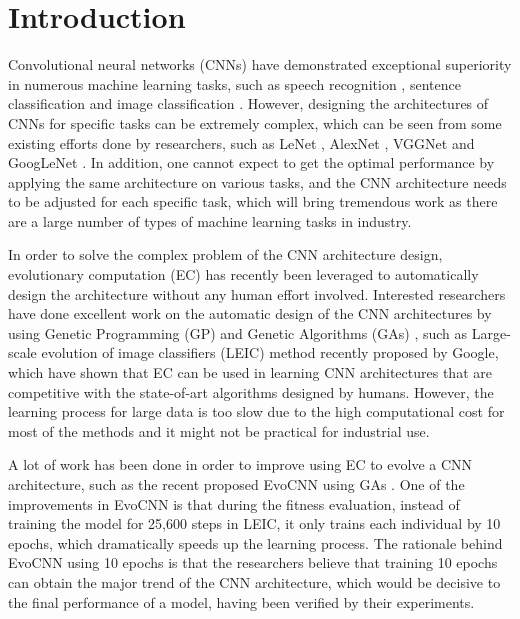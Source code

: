 \documentclass[conference]{IEEEtran}
\begin{document}
\section{Introduction}
Convolutional neural networks (CNNs) have demonstrated exceptional superiority in numerous machine learning tasks, such as speech recognition \cite{CNNspeech:Ossama}, sentence classification \cite{CNNsentence:Yoon} and image classification \cite{ImageNet:Alex}. However, designing the architectures of CNNs for specific tasks can be extremely complex, which can be seen from some existing efforts done by researchers, such as LeNet \cite{ZipcodeRecognition:LeCun}\cite{DocumentRecognition:LeCun}, AlexNet \cite{ImageNet:Alex}, VGGNet \cite{CNNverydeep:Simonyan} and GoogLeNet \cite{CNNdeeper:Szegedy}. %
In addition, one cannot expect to get the optimal performance by applying the same architecture on various tasks, and the CNN architecture needs to be adjusted for each specific task, which will bring tremendous work as there are a large number of types of machine learning tasks in industry. 


In order to solve the complex problem of the CNN architecture design, evolutionary computation (EC) has recently been leveraged to automatically design the architecture without any human effort involved. Interested researchers have done excellent work on the automatic design of the CNN architectures by using Genetic Programming (GP) \cite{CNNGP:Suganuma} and Genetic Algorithms (GAs) \cite{CNNevolve:Stanley}, such as Large-scale evolution of image classifiers (LEIC) method \cite{LEIC:Real} recently proposed by Google, which have shown that EC can be used in learning CNN architectures that are competitive with the state-of-art algorithms designed by humans. However, the learning process for large data is too slow due to the high computational cost for most of the methods and it might not be practical for industrial use. 


A lot of work has been done in order to improve using EC to evolve a CNN architecture, such as the recent proposed EvoCNN using GAs \cite{EvolveCNN:Yanan}. One of the improvements in EvoCNN is that during the fitness evaluation, instead of training the model for 25,600 steps in LEIC, it only trains each individual by 10 epochs, which dramatically speeds up the learning process. The rationale behind EvoCNN using 10 epochs is that the researchers believe that training 10 epochs can obtain the major trend of the CNN architecture, which would be decisive to the final performance of a model, having been verified by their experiments. 
\end{document}
